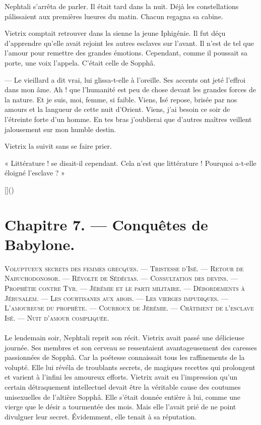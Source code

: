 \documentclass[a4paper, 11pt, oneside, polutonikogreek, french]{article}
\begin{document}
Nephtali s'arrêta de parler. Il était tard dans la nuit. Déjà les constellations pâlissaient aux premières lueures du matin. Chacun regagna sa cabine.

Vietrix comptait retrouver dans la sienne la jeune Iphigénie. Il fut déçu d'apprendre qu'elle avait rejoint les autres esclaves sur l'avant. Il n'est de tel que l'amour pour remettre des grandes émotions. Cependant, comme il poussait sa porte, une voix l'appela. C'était celle de Sopphâ.

--- Le vieillard a dit vrai, lui glissa-t-elle à l'oreille. Ses accents ont jeté l'effroi dans mon âme. Ah ! que l'humanité est peu de chose devant les grandes forces de la nature. Et je suis, moi, femme, si faible. Viens, Isé repose, brisée par nos amours et la langueur de cette nuit d'Orient. Viens, j'ai besoin ce soir de l'étreinte forte d'un homme. En tes bras j'oublierai que d'autres maîtres veillent jalousement sur mon humble destin.

Vietrix la suivit sans se faire prier.

« Littérature ! se disait-il cependant. Cela n'est que littérature ! Pourquoi a-t-elle éloigné l'esclave ? »

[]()
\clearpage
\section{Chapitre 7. --- Conquêtes de Babylone.}
\begin{center}
\scshape
\small
Voluptueux secrets des femmes grecques. --- Tristesse d'Isé. --- Retour de Nabuchodonosor. --- Révolte de Sédécias. --- Consultation des devins. --- Prophétie contre Tyr. --- Jérémie et le parti militaire. --- Débordements à Jérusalem. --- Les courtisanes aux abois. --- Les vierges impudiques. --- L'amoureuse du prophète. --- Courroux de Jérémie. --- Châtiment de l'esclave Isé. --- Nuit d'amour compliquée.
\end{center}
\paragraph{}
Le lendemain soir, Nephtali reprit son récit. Vietrix avait passé une délicieuse journée. Ses membres et son cerveau se ressentaient avantageusement des caresses passionnées de Sopphâ. Car la poétesse connaissait tous les raffinements de la volupté. Elle lui révéla de troublants secrets, de magiques recettes qui prolongent et varient à l'infini les amoureux efforts. Vietrix avait eu l'impression qu'un certain détraquement intellectuel devait être la véritable cause des coutumes unisexuelles de l'altière Sopphâ. Elle s'était donnée entière à lui, comme une vierge que le désir a tourmentée des mois. Mais elle l'avait prié de ne point divulguer leur secret. Évidemment, elle tenait à sa réputation.
\end{document}
